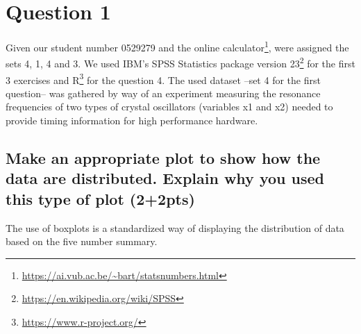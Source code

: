 \documentclass[14]{article}
\begin{document}
\author{\textbf{Faculty of Sciences and Bio-Engineering Sciences}\\[2\baselineskip]\newline\textbf{Arthur Chomé - 0529279}}

\date{ \LARGE Assignment 2: Statistics}
\title{\vspace{-6cm}}%

\maketitle
\section{Question 1}
Given our student number 0529279 and the online calculator\footnote{\protect\url{https://ai.vub.ac.be/~bart/statsnumbers.html}}, were assigned the sets 4, 1, 4 and 3. We used IBM's SPSS Statistics package version 23\footnote{\protect\url{https://en.wikipedia.org/wiki/SPSS}} for the first 3 exercises and R\footnote{\protect\url{https://www.r-project.org/}} for the question 4. 
\newline
The used dataset --set 4 for the first question-- was gathered by way of an experiment measuring the resonance frequencies of two types of crystal oscillators (variables x1 and x2) needed to provide timing information for high performance hardware. 

\subsection{Make an appropriate plot to show how the data are distributed. Explain why you used this type of plot (2+2pts)}
The use of boxplots is a standardized way of displaying the distribution of data based on the five number summary. 
\end{document}
